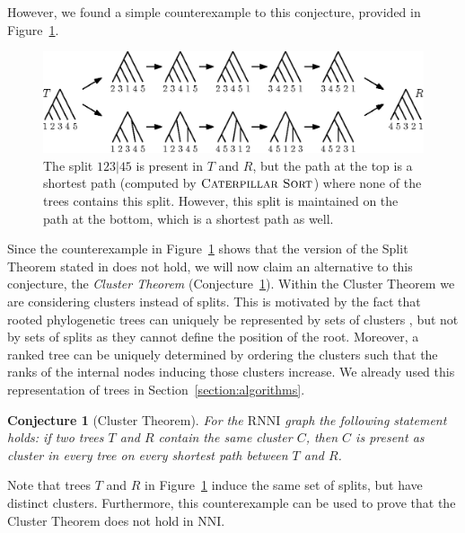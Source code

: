 \documentclass{amsart}
\newcommand{\nni}{\mathrm{NNI}}
\newcommand{\rnni}{\mathrm{RNNI}}
\newcommand{\csort}{\textsc{Caterpillar Sort}}
\newtheorem{conjecture}[definition]{Conjecture}
\begin{document}
However, we found a simple counterexample to this conjecture, provided in Figure~\ref{fig:splitthm_counterexample}.

\begin{figure}[H]
	\centering
	\includegraphics[width=\textwidth]{splitthm_counterexample}
    \vspace{2pt}
	\caption{The split $123|45$ is present in $T$ and $R$, but the path at the top is a shortest path (computed by $\csort$) where none of the trees contains this split.
    However, this split is maintained on the path at the bottom, which is a shortest path as well.}
	\label{fig:splitthm_counterexample}
\end{figure}

Since the counterexample in Figure~\ref{fig:splitthm_counterexample} shows that the version of the Split Theorem stated in \autocite{Gavryushkin2018-ol} does not hold, we will now claim an alternative to this conjecture, the \emph{Cluster Theorem} (Conjecture~\ref{conjecture:cluster_theorem}).
Within the Cluster Theorem we are considering clusters instead of splits.
This is motivated by the fact that rooted phylogenetic trees can uniquely be represented by sets of clusters \autocite{Steel2016-ye}, but not by sets of splits as they cannot define the position of the root.
Moreover, a ranked tree can be uniquely determined by ordering the clusters such that the ranks of the internal nodes inducing those clusters increase.
We already used this representation of trees in Section~\ref{section:algorithms}.

\begin{conjecture}[Cluster Theorem]
	For the $\rnni$ graph the following statement holds:
	if two trees $T$ and $R$ contain the same cluster $C$, then $C$ is present as cluster in every tree on every shortest path between $T$ and $R$.
	\label{conjecture:cluster_theorem}
\end{conjecture}

Note that trees $T$ and $R$ in Figure~\ref{fig:splitthm_counterexample} induce the same set of splits, but have distinct clusters.
Furthermore, this counterexample can be used to prove that the Cluster Theorem does not hold in $\nni$.
\end{document}
